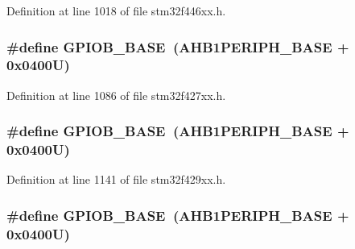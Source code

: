 Definition at line 1018 of file stm32f446xx.\+h.

\subsubsection[{\texorpdfstring{G\+P\+I\+O\+B\+\_\+\+B\+A\+SE}{GPIOB_BASE}}]{\setlength{\rightskip}{0pt plus 5cm}\#define G\+P\+I\+O\+B\+\_\+\+B\+A\+SE~({\bf A\+H\+B1\+P\+E\+R\+I\+P\+H\+\_\+\+B\+A\+SE} + 0x0400\+U)}\hypertarget{group___peripheral__memory__map_gac944a89eb789000ece920c0f89cb6a68}{}\label{group___peripheral__memory__map_gac944a89eb789000ece920c0f89cb6a68}


Definition at line 1086 of file stm32f427xx.\+h.

\subsubsection[{\texorpdfstring{G\+P\+I\+O\+B\+\_\+\+B\+A\+SE}{GPIOB_BASE}}]{\setlength{\rightskip}{0pt plus 5cm}\#define G\+P\+I\+O\+B\+\_\+\+B\+A\+SE~({\bf A\+H\+B1\+P\+E\+R\+I\+P\+H\+\_\+\+B\+A\+SE} + 0x0400\+U)}\hypertarget{group___peripheral__memory__map_gac944a89eb789000ece920c0f89cb6a68}{}\label{group___peripheral__memory__map_gac944a89eb789000ece920c0f89cb6a68}


Definition at line 1141 of file stm32f429xx.\+h.

\subsubsection[{\texorpdfstring{G\+P\+I\+O\+B\+\_\+\+B\+A\+SE}{GPIOB_BASE}}]{\setlength{\rightskip}{0pt plus 5cm}\#define G\+P\+I\+O\+B\+\_\+\+B\+A\+SE~({\bf A\+H\+B1\+P\+E\+R\+I\+P\+H\+\_\+\+B\+A\+SE} + 0x0400\+U)}\hypertarget{group___peripheral__memory__map_gac944a89eb789000ece920c0f89cb6a68}{}\label{group___peripheral__memory__map_gac944a89eb789000ece920c0f89cb6a68}


